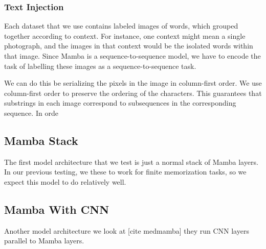 \subsubsection{Text Injection}
Each dataset that we use contains labeled images of words, which grouped
together according to context. For instance, one context might mean a single
photograph, and the images in that context would be the isolated words within
that image.
Since Mamba is a sequence-to-sequence model, we have to encode the task of
labelling these images as a sequence-to-sequence task.


We can do this be serializing the pixels in the image in column-first order. We
use column-first order to preserve the ordering of the characters. This
guarantees that substrings in each image correspond to subsequences in the
corresponding sequence.
In orde

\subsection{Mamba Stack}
The first model architecture that we test is just a normal stack of Mamba
layers. In our previous testing, we these to work for finite memorization tasks,
so we expect this model to do relatively well.
\subsection{Mamba With CNN}
Another model architecture we look at [cite medmamba] they run CNN layers
parallel to Mamba layers.
\subsection{}
